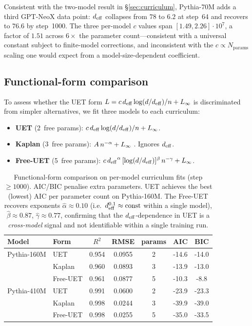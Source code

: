 Consistent with the two-model result in \S\ref{sec:curriculum},
Pythia-70M adds a third GPT-NeoX data point:
$\deff$ collapses from $78$ to $6.2$ at step~64 and recovers to $76.6$ by step~1000.
The three per-model $c$ values span $[1.49, 2.26]\cdot 10^{7}$, a factor of $1.51$
across $6\times$ the parameter count---consistent with a universal constant subject
to finite-model corrections, and inconsistent with the $c \propto N_{\mathrm{params}}$
scaling one would expect from a model-size-dependent coefficient.

\subsection{Functional-form comparison}
\label{sec:form-ablation}

To assess whether the UET form $L = c\,d_{\mathrm{eff}}\log(d/d_{\mathrm{eff}})/n + L_{\infty}$ is
discriminated from simpler alternatives, we fit three models to each curriculum:

\begin{itemize}[leftmargin=1.5em,itemsep=1pt]
\item \textbf{UET} (2~free params): $c\,d_{\mathrm{eff}}\log(d/d_{\mathrm{eff}})/n + L_{\infty}$.
\item \textbf{Kaplan} (3~free params): $A\,n^{-\alpha} + L_{\infty}$
      \citep{kaplan2020scaling}. Ignores $\deff$.
\item \textbf{Free-UET} (5~free params):
      $c\,{d_{\mathrm{eff}}}^{\alpha}\,[\log(d/d_{\mathrm{eff}})]^{\beta}\,n^{-\gamma} + L_{\infty}$.
\end{itemize}

\begin{table}[H]
\centering\small
\begin{tabular}{llSSSSS}
\toprule
Model & Form & {$R^2$} & {RMSE} & {params} & {AIC} & {BIC} \\
\midrule
Pythia-160M & UET      & 0.954 & 0.0955 & 2 & -14.6 & -14.0 \\
            & Kaplan   & 0.960 & 0.0893 & 3 & -13.9 & -13.0 \\
            & Free-UET & 0.961 & 0.0877 & 5 & -10.3 &  -8.8 \\
\midrule
Pythia-410M & UET      & 0.991 & 0.0600 & 2 & -23.9 & -23.3 \\
            & Kaplan   & 0.998 & 0.0244 & 3 & -39.9 & -39.0 \\
            & Free-UET & 0.998 & 0.0255 & 5 & -35.0 & -33.5 \\
\bottomrule
\end{tabular}
\caption{Functional-form comparison on per-model curriculum fits (step $\geq 1000$).
AIC/BIC penalise extra parameters. UET achieves the best (lowest) AIC per parameter
count on Pythia-160M. The Free-UET recovers exponents $\hat\alpha \approx 0.10$
(i.e.\ $\deff^{0.1} \approx \mathrm{const}$ within a single model), $\hat\beta \approx 0.87$,
$\hat\gamma \approx 0.77$, confirming that the $\deff$-dependence in UET is a
\emph{cross-model} signal and not identifiable within a single training run.}
\label{tab:form-ablation}
\end{table}


